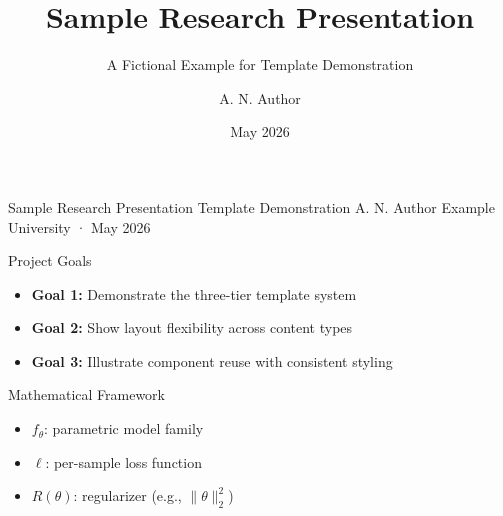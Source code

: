 \documentclass[aspectratio=169,10pt]{beamer}
\title{Sample Research Presentation}
\subtitle{A Fictional Example for Template Demonstration}
\author{A. N. Author}
\institute{Example University\\Department of Demonstrations}
\date{May 2026}
\begin{document}
\TLtitlecenter
  {Sample Research Presentation}
  {Template Demonstration}
  {A. N. Author}
  {Example University · May 2026}


\begin{frame}{Project Goals}
  \begin{TLtext}
    \begin{itemize}
      \item \textbf{Goal 1:} Demonstrate the three-tier template system
      \item \textbf{Goal 2:} Show layout flexibility across content types
      \item \textbf{Goal 3:} Illustrate component reuse with consistent styling
    \end{itemize}
  \end{TLtext}

  \vspace{0.5em}
\end{frame}


\begin{frame}{Mathematical Framework}

  \vspace{0.5em}
  \begin{TLtext}
    \begin{itemize}
      \item $f_\theta$: parametric model family
      \item $\ell$: per-sample loss function
      \item $R(\theta)$: regularizer (e.g., $\|\theta\|_2^2$)
    \end{itemize}
  \end{TLtext}
\end{frame}
\end{document}
